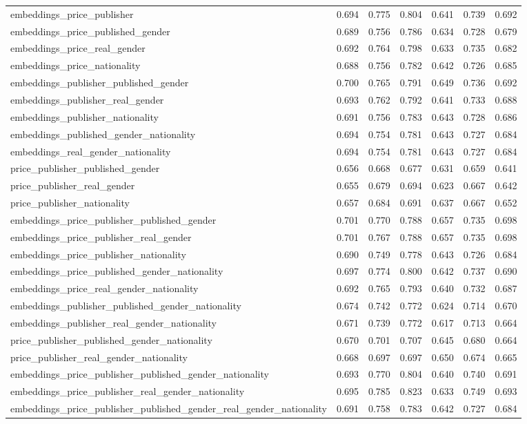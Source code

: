 \begin{table*}
\begin{tabular}{l|cc|cc|cc}
    embeddings_price_publisher & 0.694 & 0.775 & 0.804 & 0.641 & 0.739 & 0.692 \\
    embeddings_price_published_gender & 0.689 & 0.756 & 0.786 & 0.634 & 0.728 & 0.679 \\
    embeddings_price_real_gender & 0.692 & 0.764 & 0.798 & 0.633 & 0.735 & 0.682 \\
    embeddings_price_nationality & 0.688 & 0.756 & 0.782 & 0.642 & 0.726 & 0.685 \\
    embeddings_publisher_published_gender & 0.700 & 0.765 & 0.791 & 0.649 & 0.736 & 0.692 \\
    embeddings_publisher_real_gender & 0.693 & 0.762 & 0.792 & 0.641 & 0.733 & 0.688 \\
    embeddings_publisher_nationality & 0.691 & 0.756 & 0.783 & 0.643 & 0.728 & 0.686 \\
    embeddings_published_gender_nationality & 0.694 & 0.754 & 0.781 & 0.643 & 0.727 & 0.684 \\
    embeddings_real_gender_nationality & 0.694 & 0.754 & 0.781 & 0.643 & 0.727 & 0.684 \\
    price_publisher_published_gender & 0.656 & 0.668 & 0.677 & 0.631 & 0.659 & 0.641 \\
    price_publisher_real_gender & 0.655 & 0.679 & 0.694 & 0.623 & 0.667 & 0.642 \\
    price_publisher_nationality & 0.657 & 0.684 & 0.691 & 0.637 & 0.667 & 0.652 \\
    embeddings_price_publisher_published_gender & 0.701 & 0.770 & 0.788 & 0.657 & 0.735 & 0.698 \\
    embeddings_price_publisher_real_gender & 0.701 & 0.767 & 0.788 & 0.657 & 0.735 & 0.698 \\
    embeddings_price_publisher_nationality & 0.690 & 0.749 & 0.778 & 0.643 & 0.726 & 0.684 \\
    embeddings_price_published_gender_nationality & 0.697 & 0.774 & 0.800 & 0.642 & 0.737 & 0.690 \\
    embeddings_price_real_gender_nationality & 0.692 & 0.765 & 0.793 & 0.640 & 0.732 & 0.687 \\
    embeddings_publisher_published_gender_nationality & 0.674 & 0.742 & 0.772 & 0.624 & 0.714 & 0.670 \\
    embeddings_publisher_real_gender_nationality & 0.671 & 0.739 & 0.772 & 0.617 & 0.713 & 0.664 \\
    price_publisher_published_gender_nationality & 0.670 & 0.701 & 0.707 & 0.645 & 0.680 & 0.664 \\
    price_publisher_real_gender_nationality & 0.668 & 0.697 & 0.697 & 0.650 & 0.674 & 0.665 \\
    embeddings_price_publisher_published_gender_nationality & 0.693 & 0.770 & 0.804 & 0.640 & 0.740 & 0.691 \\
    embeddings_price_publisher_real_gender_nationality & 0.695 & 0.785 & 0.823 & 0.633 & 0.749 & 0.693 \\
    embeddings_price_publisher_published_gender_real_gender_nationality & 0.691 & 0.758 & 0.783 & 0.642 & 0.727 & 0.684 \\


\end{tabular}
\end{table*}
